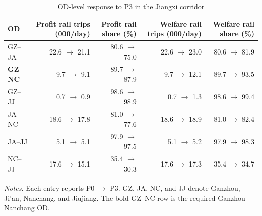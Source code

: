 \begin{table}[htbp]
\centering
\caption{OD-level response to P3 in the Jiangxi corridor}\label{tab:jiangxi_od_outcomes}
\begingroup
\footnotesize
\setlength{\tabcolsep}{0.50em}
\renewcommand{\arraystretch}{1.08}
\begin{tabular}{@{}lrrrr@{}}
\toprule
OD & Profit rail trips (000/day) & Profit rail share (\%) & Welfare rail trips (000/day) & Welfare rail share (\%) \\
\midrule
GZ--JA & 22.6 $\rightarrow$ 21.1 & 80.6 $\rightarrow$ 75.0 & 22.6 $\rightarrow$ 23.0 & 80.6 $\rightarrow$ 81.9 \\
\textbf{GZ--NC} & 9.7 $\rightarrow$ 9.1 & 89.7 $\rightarrow$ 87.9 & 9.7 $\rightarrow$ 12.1 & 89.7 $\rightarrow$ 93.5 \\
GZ--JJ & 0.7 $\rightarrow$ 0.9 & 98.6 $\rightarrow$ 98.9 & 0.7 $\rightarrow$ 1.3 & 98.6 $\rightarrow$ 99.4 \\
JA--NC & 18.6 $\rightarrow$ 17.8 & 81.0 $\rightarrow$ 77.6 & 18.6 $\rightarrow$ 18.9 & 81.0 $\rightarrow$ 82.4 \\
JA--JJ & 5.1 $\rightarrow$ 5.1 & 97.9 $\rightarrow$ 97.5 & 5.1 $\rightarrow$ 5.2 & 97.9 $\rightarrow$ 98.3 \\
NC--JJ & 17.6 $\rightarrow$ 15.1 & 35.4 $\rightarrow$ 30.3 & 17.6 $\rightarrow$ 17.3 & 35.4 $\rightarrow$ 34.7 \\
\bottomrule
\end{tabular}
\parbox{0.96\textwidth}{\footnotesize\textit{Notes.} Each entry reports P0 $\rightarrow$ P3. GZ, JA, NC, and JJ denote Ganzhou, Ji'an, Nanchang, and Jiujiang. The bold GZ--NC row is the required Ganzhou--Nanchang OD.}
\endgroup
\end{table}
